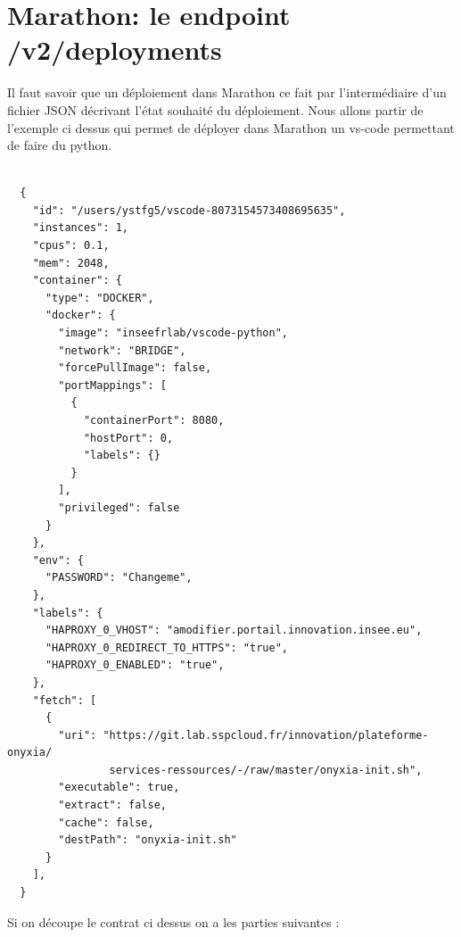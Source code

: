 \documentclass[11pt,fleqn]{book} %
\begin{document}
\section*{Marathon: le endpoint /v2/deployments}
Il faut savoir que un déploiement dans Marathon ce fait par l'intermédiaire d'un fichier JSON décrivant l'état souhaité du déploiement. Nous allons partir de l'exemple ci dessus qui permet de déployer dans Marathon un vs-code permettant de faire du python.
\begin{verbatim}

  {
    "id": "/users/ystfg5/vscode-8073154573408695635",
    "instances": 1,
    "cpus": 0.1,
    "mem": 2048,
    "container": {
      "type": "DOCKER",
      "docker": {
        "image": "inseefrlab/vscode-python",
        "network": "BRIDGE",
        "forcePullImage": false,
        "portMappings": [
          {
            "containerPort": 8080,
            "hostPort": 0,
            "labels": {}
          }
        ],
        "privileged": false
      }
    },
    "env": {
      "PASSWORD": "Changeme",
    },
    "labels": {
      "HAPROXY_0_VHOST": "amodifier.portail.innovation.insee.eu",
      "HAPROXY_0_REDIRECT_TO_HTTPS": "true",
      "HAPROXY_0_ENABLED": "true",
    },
    "fetch": [
      {
        "uri": "https://git.lab.sspcloud.fr/innovation/plateforme-onyxia/
                services-ressources/-/raw/master/onyxia-init.sh",
        "executable": true,
        "extract": false,
        "cache": false,
        "destPath": "onyxia-init.sh"
      }
    ],
  }

\end{verbatim}
Si on découpe le contrat ci dessus on a les parties suivantes : 
\end{document}
